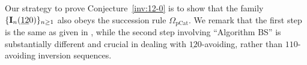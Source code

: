 \documentclass[12pt,A4]{amsart}
\numberwithin{equation}{section}
\theoremstyle{plain}
\newtheorem{theorem}{Theorem}[section]
\theoremstyle{definition}
\def\zero{\mathrm{zero}}
\def\I{\operatorname{{\bf I}}}
\begin{document}
Our strategy to prove Conjecture~\ref{inv:12-0} is to show that the family $\{\I_n(\underline{12}0)\}_{n\ge 1}$ also obeys the succession rule $\Omega_{\mathrm{pCat}}$. We remark that the first step is the same as given in \cite{bbgr}, while the second step involving ``Algorithm BS'' is substantially different and crucial in dealing with $\underline{12}0$-avoiding, rather than $110$-avoiding inversion sequences.
\end{document}
